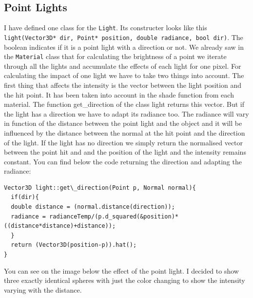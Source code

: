 \documentclass[a4paper,11.5pt]{article}
\theoremstyle{mytheor}
\begin{document}
\subsection{Point Lights}
I have defined one class for the \texttt{Light}. Its constructer looks like this \texttt{light(Vector3D* dir, Point* position, double radiance, bool dir)}. The boolean indicates if it is a point light with a direction or not. We already saw in the \texttt{Material} class that for calculating the brightness of a point we iterate through all the lights and accumulate the effects of each light for one pixel. For calculating the impact of one light we have to take two things into account. The first thing that affects the intensity is the vector between the light position and the hit point. It has been taken into account in the shade function from each material. The function get\_direction of the class light returns this vector. But if the light has a direction we have to adapt its radiance too. The radiance will vary in function of the distance between the point light and the object and it will be influenced by the distance between the normal at the hit point and the direction of the light. If the light has no direction we simply return the normalised vector between the point hit and and the position of the light and the intensity remains constant. You can find below the code returning the direction and adapting the radiance:
\begin{lstlisting}
Vector3D light::get\_direction(Point p, Normal normal){
  if(dir){
  double distance = (normal.distance(direction));
  radiance = radianceTemp/(p.d_squared(&position)*((distance*distance)+distance));
  }
  return (Vector3D(position-p)).hat();
}
\end{lstlisting}
You can see on the image below the effect of the point light. I decided to show three exactly identical spheres with just the color changing to show the intensity varying with the distance. 
\begin{figure}[H]
\centering
{}
\end{figure}
\end{document}
